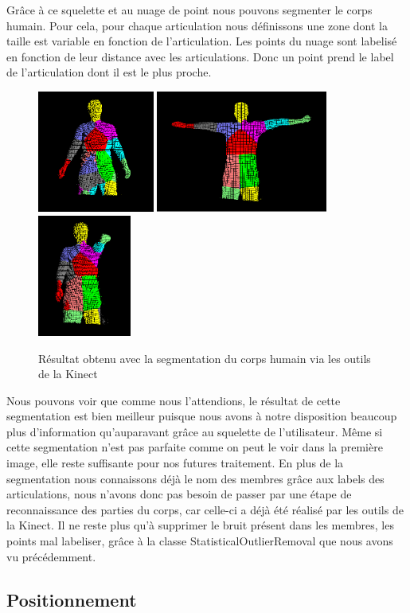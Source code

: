 Grâce à ce squelette et au nuage de point nous pouvons segmenter le corps humain. Pour cela, pour chaque articulation nous définissons une zone
dont la taille est variable en fonction de l'articulation. Les points du nuage sont labelisé en fonction de leur distance avec les articulations.
Donc un point prend le label de l'articulation dont il est le plus proche.

\begin{figure}[!ht]
  \begin{center}
    \includegraphics[height=4cm]{image/lab1.PNG} 
    \includegraphics[height=4cm]{image/lab2.PNG}
    \includegraphics[height=4cm]{image/lab3.PNG}
    \caption{Résultat obtenu avec la segmentation du corps humain via les outils de la Kinect}
  \end{center}
\end{figure}

Nous pouvons voir que comme nous l'attendions, le résultat de cette segmentation est bien meilleur puisque nous avons à notre disposition
beaucoup plus d'information qu'auparavant grâce au squelette de l'utilisateur. Même si cette segmentation n'est pas parfaite comme on peut
le voir dans la première image, elle reste suffisante pour nos futures traitement. En plus de la segmentation nous connaissons déjà le nom
des membres grâce aux labels des articulations, nous n'avons donc pas besoin de passer par une étape de reconnaissance des parties du
corps, car celle-ci a déjà été réalisé par les outils de la Kinect. Il ne reste plus qu'à supprimer le bruit présent dans les membres, les points
mal labeliser, grâce à la classe StatisticalOutlierRemoval que nous avons vu précédemment.

\subsection{Positionnement}
